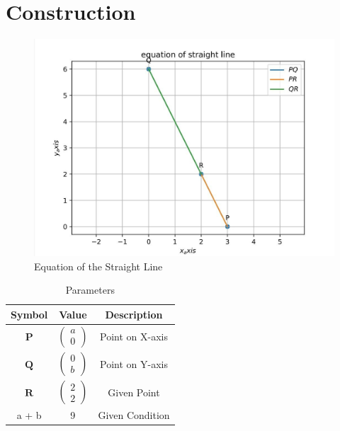 \documentclass[journal,12pt,twocolumn]{IEEEtran}
\newcommand{\myvec}[1]{\ensuremath{\begin{pmatrix}#1\end{pmatrix}}}
\let\vec\mathbf
\begin{document}
\section{Construction}
\begin{figure}[h]
    \centering
\includegraphics[width=\columnwidth]{figs/assign4.png}
    \caption{Equation of the Straight Line}
    \label{fig:my_label}
\end{figure}
\vspace{2cm}
\begin{table}[h]
    \centering
    \begin{tabular}{|c|c|c|}
       \hline
       \textbf{Symbol}&\textbf{Value}&\textbf{Description}  \\
       \hline
	    $\vec{P}$ & $\myvec{
		    a\\
		    0}$
	    & Point on X-axis\\
        \hline
	    $\vec{Q}$ & $\myvec{0\\b}$
 & Point on Y-axis\\
        \hline
	    $\vec{R}$ & $\myvec{
  2\\
  2}$
 & Given Point \\
        \hline
        a + b & 9 & Given Condition\\
        \hline
    \end{tabular}
    \caption{Parameters}
    \label{tab:my_label}
\end{table}
\end{document}
